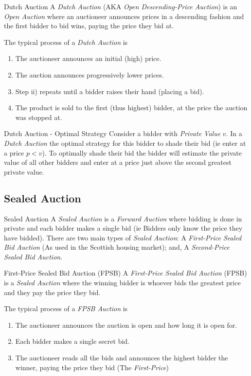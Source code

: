 \documentclass[11pt,a4paper]{article}
\begin{document}
  \begin{definition}{Dutch Auction}
    A \textit{Dutch Auction} (AKA \textit{Open Descending-Price Auction}) is an \textit{Open Auction} where an auctioneer announces prices in a descending fashion and the first bidder to bid wins, paying the price they bid at.
    \par The typical process of a \textit{Dutch Auction} is
    \begin{enumerate}
      \item The auctioneer announces an initial (high) price.
      \item The auction announces progressively lower prices.
      \item Step ii) repeats until a bidder raises their hand (placing a bid).
      \item The product is sold to the first (thus highest) bidder, at the price the auction was stopped at.
    \end{enumerate}
  \end{definition}

  \begin{proposition}{Dutch Auction - Optimal Strategy}
      Consider a bidder with \textit{Private Value} $v$. In a \textit{Dutch Auction} the optimal strategy for this bidder to shade their bid (ie enter at a price $p<v$). To optimally shade their bid the bidder will estimate the private value of all other bidders and enter at a price just above the second greatest private value.
  \end{proposition}

\subsection*{Sealed Auction}

  \begin{definition}{Sealed Auction}
    A \textit{Sealed Auction} is a \textit{Forward Auction} where bidding is done in private and each bidder makes a single bid (ie Bidders only know the price they have bidded). There are two main types of \textit{Sealed Auction}: A \textit{First-Price Sealed Bid Auction} (As used in the Scottish housing market); and, A \textit{Second-Price Sealed Bid Auction}.
  \end{definition}

  \begin{definition}{First-Price Sealed Bid Auction (FPSB)}
    A \textit{First-Price Sealed Bid Auction} (FPSB) is a \textit{Sealed Auction} where the winning bidder is whoever bids the greatest price and they pay the price they bid.
    \par The typical process of a \textit{FPSB Auction} is
    \begin{enumerate}
      \item The auctioneer announces the auction is open and how long it is open for.
      \item Each bidder makes a single secret bid.
      \item The auctioneer reads all the bids and announces the highest bidder the winner, paying the price they bid (The \textit{First-Price})
    \end{enumerate}
  \end{definition}
\end{document}
